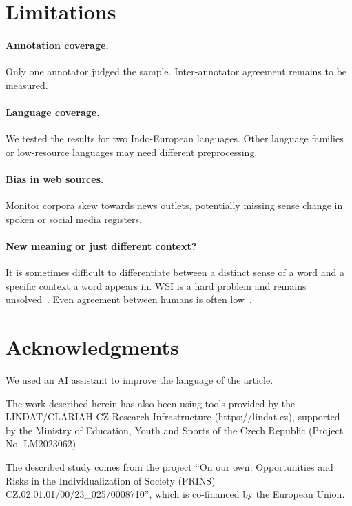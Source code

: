 \documentclass[11pt]{article}
\begin{document}
\section*{Limitations}
\paragraph{Annotation coverage.}
Only one annotator judged the sample. Inter-annotator agreement remains to be measured.
\paragraph{Language coverage.}
We tested the results for two Indo-European languages. Other language families or low-resource languages may need different preprocessing.
\paragraph{Bias in web sources.}
Monitor corpora skew towards news outlets,
potentially missing sense change in spoken or social media registers.
\paragraph{New meaning or just different context?}
It is sometimes difficult to differentiate between a distinct sense of a word and a specific context a word appears in. WSI is a hard problem and remains unsolved~\citep{mosolova-etal-2025-llm}. Even agreement between humans is often low~\citep{kilgarriff1997don,herman2024shadowsense}.


\section*{Acknowledgments}
We used an AI assistant to improve the language of the article.

The work described herein has also been using tools provided by the LINDAT/CLARIAH-CZ Research Infrastructure (https://lindat.cz), supported by the Ministry of Education, Youth and Sports of the Czech Republic (Project No. LM2023062)

The described study comes from the project ``On our own: Opportunities and
Risks in the Individualization of Society (PRINS)
CZ.02.01.01/00/23\_025/0008710'', which is co-financed by the European
Union.



%


\appendix

\end{document}
